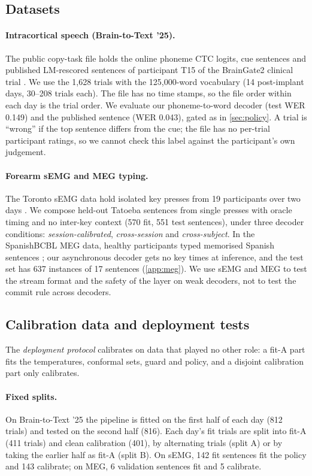 \subsection{Datasets}
\paragraph{Intracortical speech (Brain-to-Text '25).} The public copy-task file holds the online phoneme CTC logits, cue sentences and published LM-rescored sentences of participant T15 of the BrainGate2 clinical trial \citep{card2024accurate,card2025data}. We use the 1,628 trials with the 125,000-word vocabulary (14 post-implant days, 30--208 trials each). The file has no time stamps, so the file order within each day is the trial order. We evaluate our phoneme-to-word decoder (test WER 0.149) and the published sentence (WER 0.043), gated as in \cref{sec:policy}. A trial is ``wrong'' if the top sentence differs from the cue; the file has no per-trial participant ratings, so we cannot check this label against the participant's own judgement.

\paragraph{Forearm sEMG and MEG typing.} The Toronto sEMG data hold isolated key presses from 19 participants over two days \citep{achituve2025emg,achituve2024data}. We compose held-out Tatoeba sentences from single presses with oracle timing and no inter-key context (570 fit, 551 test sentences), under three decoder conditions: \emph{session-calibrated}, \emph{cross-session} and \emph{cross-subject}. In the SpanishBCBL MEG data, healthy participants typed memorised Spanish sentences \citep{levy2026brain2qwerty,spanishbcbl}; our asynchronous decoder gets no key times at inference, and the test set has 637 instances of 17 sentences (\cref{app:meg}). We use sEMG and MEG to test the stream format and the safety of the layer on weak decoders, not to test the commit rule across decoders.

\subsection{Calibration data and deployment tests}
\label{sec:splits}
The \emph{deployment protocol} calibrates on data that played no other role: a fit-A part fits the temperatures, conformal sets, guard and policy, and a disjoint calibration part only calibrates.

\paragraph{Fixed splits.} On Brain-to-Text '25 the pipeline is fitted on the first half of each day (812 trials) and tested on the second half (816). Each day's fit trials are split into fit-A (411 trials) and clean calibration (401), by alternating trials (split A) or by taking the earlier half as fit-A (split B). On sEMG, 142 fit sentences fit the policy and 143 calibrate; on MEG, 6 validation sentences fit and 5 calibrate.

